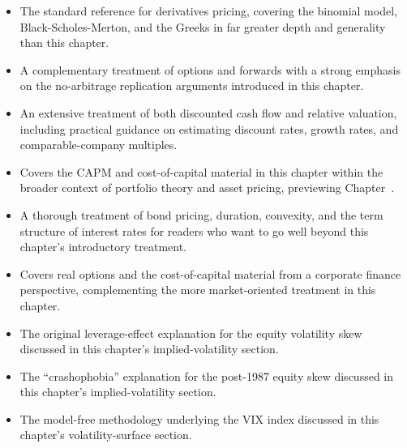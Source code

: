 \documentclass[../ai_in_finance]{subfiles}
\begin{document}
\begin{itemize}
    \item {} The standard reference for derivatives pricing, covering the binomial model, Black-Scholes-Merton, and the Greeks in far greater depth and generality than this chapter.
    \item {} A complementary treatment of options and forwards with a strong emphasis on the no-arbitrage replication arguments introduced in this chapter.
    \item {} An extensive treatment of both discounted cash flow and relative valuation, including practical guidance on estimating discount rates, growth rates, and comparable-company multiples.
    \item {} Covers the CAPM and cost-of-capital material in this chapter within the broader context of portfolio theory and asset pricing, previewing Chapter~.
    \item {} A thorough treatment of bond pricing, duration, convexity, and the term structure of interest rates for readers who want to go well beyond this chapter's introductory treatment.
    \item {} Covers real options and the cost-of-capital material from a corporate finance perspective, complementing the more market-oriented treatment in this chapter.
    \item {} The original leverage-effect explanation for the equity volatility skew discussed in this chapter's implied-volatility section.
    \item {} The ``crashophobia'' explanation for the post-1987 equity skew discussed in this chapter's implied-volatility section.
    \item {} The model-free methodology underlying the VIX index discussed in this chapter's volatility-surface section.
\end{itemize}
\end{document}
